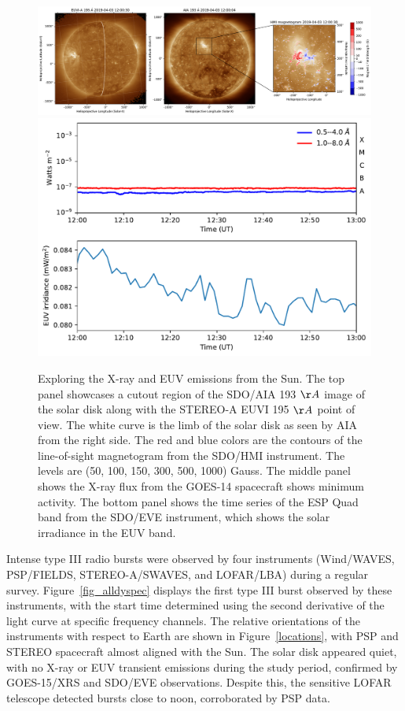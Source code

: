 \begin{figure}[!htp]
	\centering
	\includegraphics[width=\hsize]{chapter3/figs/aia_sta_cutout.pdf}
	\includegraphics[width=12cm]{chapter3/figs/xrs_eve.pdf}
	\caption{Exploring the X-ray and EUV emissions from the Sun. The top panel showcases a cutout region of the SDO/AIA 193 $\AA$ image of the solar disk along with the STEREO-A EUVI 195 $\AA$ point of view. The white curve is the limb of the solar disk as seen by AIA from the right side. The red and blue colors are the contours of the line-of-sight magnetogram from the SDO/HMI instrument. The levels are (50, 100, 150, 300, 500, 1000) Gauss. The middle panel shows the X-ray flux from the GOES-14 spacecraft shows minimum activity. The bottom panel shows the time series of the ESP Quad band from the SDO/EVE instrument, which shows the solar irradiance in the EUV band.}
	\label{soldisk_xrs}
\end{figure}

Intense type III radio bursts were observed by four instruments (Wind/WAVES, PSP/FIELDS, STEREO-A/SWAVES, and LOFAR/LBA) during a regular survey. Figure~\ref{fig_alldyspec} displays the first type III burst observed by these instruments, with the start time determined using the second derivative of the light curve at specific frequency channels. The relative orientations of the instruments with respect to Earth are shown in Figure~\ref{locations}, with PSP and STEREO spacecraft almost aligned with the Sun. The solar disk appeared quiet, with no X-ray or EUV transient emissions during the study period, confirmed by GOES-15/XRS and SDO/EVE observations. Despite this, the sensitive LOFAR telescope detected bursts close to noon, corroborated by PSP data.

